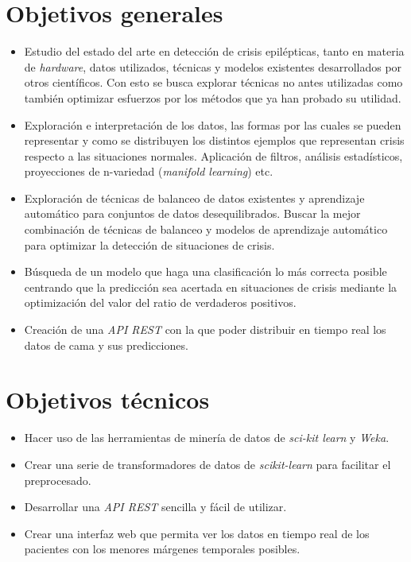 
\section{Objetivos generales}

\begin{itemize}
	\item Estudio del estado del arte en detección de crisis epilépticas, tanto en materia de \textit{hardware}, datos utilizados, técnicas y modelos existentes desarrollados por otros científicos. Con esto se busca explorar técnicas no antes utilizadas como también optimizar esfuerzos por los métodos que ya han probado su utilidad.
	\item Exploración e interpretación de los datos, las formas por las cuales se pueden representar y como se distribuyen los distintos ejemplos que representan crisis respecto a las situaciones normales. Aplicación de filtros, análisis estadísticos, proyecciones de n-variedad (\textit{manifold learning}) etc.
	\item Exploración de técnicas de balanceo de datos existentes y aprendizaje automático para conjuntos de datos desequilibrados. Buscar la mejor combinación de técnicas de balanceo y modelos de aprendizaje automático para optimizar la detección de situaciones de crisis.
	\item Búsqueda de un modelo que haga una clasificación lo más correcta posible centrando que la predicción sea acertada en situaciones de crisis mediante la optimización del valor del ratio de verdaderos positivos.
	\item Creación de una \textit{API REST} con la que poder distribuir en tiempo real los datos de cama y sus predicciones.
\end{itemize}

\section{Objetivos técnicos}

\begin{itemize}
	\item Hacer uso de las herramientas de minería de datos de \textit{sci-kit learn} y \textit{Weka}.
	\item Crear una serie de transformadores de datos de \textit{scikit-learn} para facilitar el preprocesado.
	\item Desarrollar una \textit{API REST} sencilla y fácil de utilizar.
	\item Crear una interfaz web que permita ver los datos en tiempo real de los pacientes con los menores márgenes temporales posibles.
\end{itemize}

